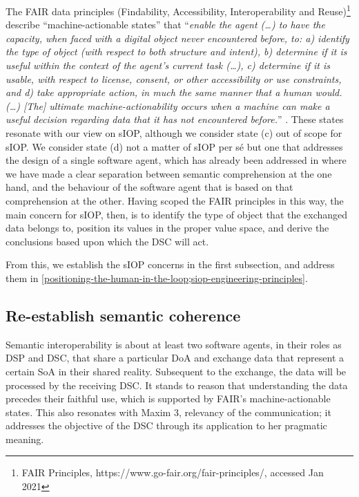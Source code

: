 \documentclass[sort&compress,preprint,authoryear,3p,twocolumn]{elsarticle}
\begin{document}
The FAIR data principles (Findability, Accessibility, Interoperability
and Reuse)\footnote{FAIR Principles,
  https://www.go-fair.org/fair-principles/, accessed Jan 2021} describe
``machine-actionable states'' that ``\emph{enable the agent (\ldots) to
have the capacity, when faced with a digital object never encountered
before, to: a) identify the type of object (with respect to both
structure and intent), b) determine if it is useful within the context
of the agent's current task (\ldots), c) determine if it is usable, with
respect to license, consent, or other accessibility or use constraints,
and d) take appropriate action, in much the same manner that a human
would. (\ldots) {[}The{]} ultimate machine-actionability occurs when a
machine can make a useful decision regarding data that it has not
encountered before.}'' \citep{Wilkinson2016}. These states resonate with
our view on sIOP, although we consider state (c) out of scope for sIOP.
We consider state (d) not a matter of sIOP per sé but one that addresses
the design of a single software agent, which has already been addressed
in \citep[DP 2]{Brandt2021a} where we have made a clear separation
between semantic comprehension at the one hand, and the behaviour of the
software agent that is based on that comprehension at the other. Having
scoped the FAIR principles in this way, the main concern for sIOP, then,
is to identify the type of object that the exchanged data belongs to,
position its values in the proper value space, and derive the
conclusions based upon which the DSC will act.

From this, we establish the sIOP concerns in the first subsection, and
address them in
\cref{positioning-the-human-in-the-loop;siop-engineering-principles}.

\hypertarget{re-establish-semantic-coherence}{%
\subsection{Re-establish semantic
coherence}\label{re-establish-semantic-coherence}}

Semantic interoperability is about at least two software agents, in
their roles as DSP and DSC, that share a particular DoA and exchange
data that represent a certain SoA in their shared reality. Subsequent to
the exchange, the data will be processed by the receiving DSC. It stands
to reason that understanding the data precedes their faithful use, which
is supported by FAIR's machine-actionable states. This also resonates
with Maxim 3, relevancy of the communication; it addresses the objective
of the DSC through its application to her pragmatic meaning.
\end{document}
